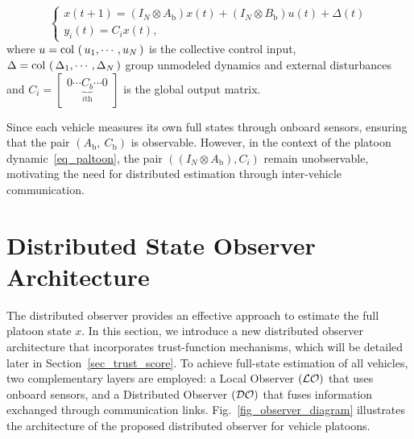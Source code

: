 \begin{equation}\label{eq_paltoon}
      \left\{ \begin{array}{l}
      x(t+1) = (I_N \otimes A_{\text{b}}) x(t) + (I_N \otimes B_{\text{b}}) u(t) + \Delta (t)\\
      y_i(t) = C_i x(t),
      \end{array}\right.
\end{equation}
where $u = \mathop{{\rm col}\,\left(\,u_{1}, \cdots , u_{N}\,\right)}$ is the collective control input, $\Delta = \mathop{{\rm col}\,\left(\,\Delta_1, \cdots, \Delta_N\,\right)}$ group unmodeled dynamics and external disturbances 
and $C_i = \begin{bmatrix}0 \cdots \underbrace{C_{b}}_{i\text{th}} \cdots 0\end{bmatrix}$ is the global output matrix.

Since each vehicle measures its own full states through onboard sensors, ensuring that the pair $(A_{\text{b}},\ C_{\text{b}})$ is observable.
However, in the context of the platoon dynamic~\eqref{eq_paltoon}, the pair $((I_N \otimes A_{\text{b}}), C_i)$ remain unobservable, motivating the need for distributed estimation through inter-vehicle communication.




\section{Distributed State Observer Architecture}\label{sec_Distributed Observer}
The distributed observer provides an effective approach to estimate the full platoon state $x$. 
In this section, we introduce a new distributed observer architecture that incorporates trust-function mechanisms, 
which will be detailed later in Section~\ref{sec_trust_score}. 
To achieve full-state estimation of all vehicles, 
two complementary layers are employed: 
a Local Observer $(\mathcal{LO})$ that uses onboard sensors, and a Distributed Observer $(\mathcal{DO})$ that fuses information exchanged through communication links.
Fig.~\ref{fig_observer_diagram} illustrates the architecture of the proposed distributed observer for vehicle platoons.  

